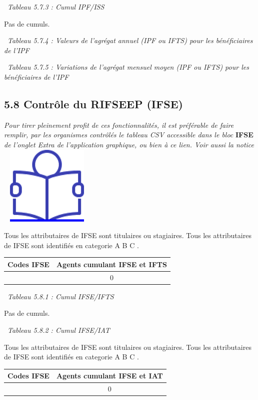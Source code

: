 ~\emph{Tableau 5.7.3 : Cumul IPF/ISS}

Pas de cumuls.

~\emph{Tableau 5.7.4 : Valeurs de l'agrégat annuel (IPF ou IFTS) pour
les bénéficiaires de l'IPF}

~\emph{Tableau 5.7.5 : Variations de l'agrégat mensuel moyen (IPF ou
IFTS) pour les bénéficiaires de l'IPF}

\hypertarget{controle-du-rifseep-ifse}{%
\subsection{5.8 Contrôle du RIFSEEP
(IFSE)}\label{controle-du-rifseep-ifse}}

\emph{Pour tirer pleinement profit de ces fonctionnalités, il est
préférable de faire remplir, par les organismes contrôlés le tableau CSV
accessible dans le bloc} \textbf{IFSE} \emph{de l'onglet Extra de
l'application graphique, ou bien à ce lien. Voir aussi la notice} ~
\href{../Docs/Notices/fiche_tableau_ifse.odt}{\includegraphics{icones/Notice.png}}

Tous les attributaires de IFSE sont titulaires ou stagiaires. Tous les
attributaires de IFSE sont identifiés en categorie A B C .

\begin{longtable}[]{@{}cc@{}}
\toprule
Codes IFSE & Agents cumulant IFSE et IFTS\tabularnewline
\midrule
\endhead
& 0\tabularnewline
\bottomrule
\end{longtable}

~\emph{Tableau 5.8.1 : Cumul IFSE/IFTS}

Pas de cumuls.

~\emph{Tableau 5.8.2 : Cumul IFSE/IAT}

Tous les attributaires de IFSE sont titulaires ou stagiaires. Tous les
attributaires de IFSE sont identifiés en categorie A B C .

\begin{longtable}[]{@{}cc@{}}
\toprule
Codes IFSE & Agents cumulant IFSE et IAT\tabularnewline
\midrule
\endhead
& 0\tabularnewline
\bottomrule
\end{longtable}

